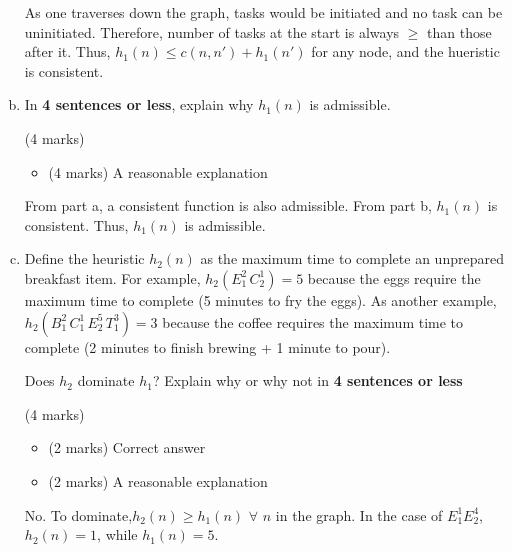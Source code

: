 \documentclass[12pt]{article}
\begin{document}
\begin{enumerate}[(a)]
\begin{markscheme}
\end{markscheme}

\begin{sol}
{\color{blue} 
As one traverses down the graph, tasks would be initiated and no task can be uninitiated. Therefore, number of tasks at the start is always $\geq$ than those after it. Thus, $h_1(n) \leq c(n, n') + h_1(n')$ for any node, and the hueristic is consistent.
}
\end{sol}

\item
\label{consistent-heuristic}
In \textbf{4 sentences or less}, explain why $h_1(n)$ is admissible.

\begin{markscheme} (4 marks)
\begin{itemize}
\item
(4 marks) A reasonable explanation
\end{itemize}

\end{markscheme}

\begin{sol}
{\color{blue}
From part a, a consistent function is also admissible. From part b, $h_1(n)$ is consistent. Thus, $h_1(n)$ is admissible. }
\end{sol}

\item
\label{domination}
Define the heuristic $h_2(n)$ as the maximum time to complete an unprepared breakfast item. 
For example, $h_2(E_1^2\,C_2^1) = 5$ because the eggs require the maximum time to complete (5 minutes to fry the eggs). As another example, $h_2(B_1^2\,C_1^1\,E_2^5\,T_1^3) = 3$ because the coffee requires the maximum time to complete (2 minutes to finish brewing + 1 minute to pour).

Does $h_2$ dominate $h_1$? Explain why or why not in \textbf{4 sentences or less}

\begin{markscheme} (4 marks)
\begin{itemize}
\item
(2 marks) Correct answer
\item
(2 marks) A reasonable explanation
\end{itemize}

\end{markscheme}
\begin{sol}
{\color{blue} 
No. To dominate,$h_2(n) \geq h_1(n)$ $\forall$ $n$ in the graph. In the case of $E_1^1E_2^4$,$h_2(n)=1$, while $h_1(n)= 5$. }
\end{sol}


\end{enumerate}
\end{document}
